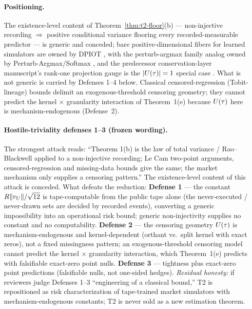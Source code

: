 \paragraph{Positioning.} The existence-level content of
Theorem~\ref{thm:t2-floor}(b) --- non-injective recording $\Rightarrow$
positive conditional variance flooring every recorded-measurable predictor ---
is generic and conceded; bare positive-dimensional fibers for learned
simulators are owned by DPIOT \citep{dpiot2022}, with the perturb-argmax
family analog owned by Perturb-Argmax/Softmax \citep{perturbargmax2024}, and
the predecessor conservation-layer manuscript's rank-one projection gauge is
the $|U(\tau)| = 1$ special case \citep{paperd}. What is not generic is carried
by Defenses 1--4 below. Classical censored-regression (Tobit-lineage) bounds
delimit an exogenous-threshold censoring geometry; they cannot predict the
kernel $\times$ granularity interaction of Theorem~1(e) because
$U(\tau)$ here is mechanism-endogenous (Defense~2).

\paragraph{Hostile-triviality defenses 1--3 (frozen wording).} The strongest
attack reads: ``Theorem 1(b) is the law of total variance / Rao--Blackwell
applied to a non-injective recording; Le Cam two-point arguments,
censored-regression and missing-data bounds give the same; the market
mechanism only supplies a censoring pattern.'' The existence-level content
of this attack is conceded. What defeats the reduction:
\textbf{Defense 1} --- the constant $R\|v_{U}\|/\sqrt{12}$ is tape-computable
from the public tape alone (the never-executed / never-drawn sets are
decided by recorded events), converting a generic impossibility into an
operational risk bound; generic non-injectivity supplies no constant and no
computability. \textbf{Defense 2} --- the censoring geometry $U(\tau)$ is
mechanism-endogenous and kernel-dependent (orthant vs.\ split kernel with
exact zeros), not a fixed missingness pattern; an exogenous-threshold
censoring model cannot predict the kernel $\times$ granularity interaction,
which Theorem~1(e) predicts with falsifiable exact-zero point nulls.
\textbf{Defense 3} --- tightness plus exact-zero point predictions
(falsifiable nulls, not one-sided hedges). \emph{Residual honesty:} if
reviewers judge Defenses 1--3 ``engineering of a classical bound,'' T2 is
repositioned as risk characterization of tape-trained market simulators with
mechanism-endogenous constants; T2 is never sold as a new estimation theorem.

